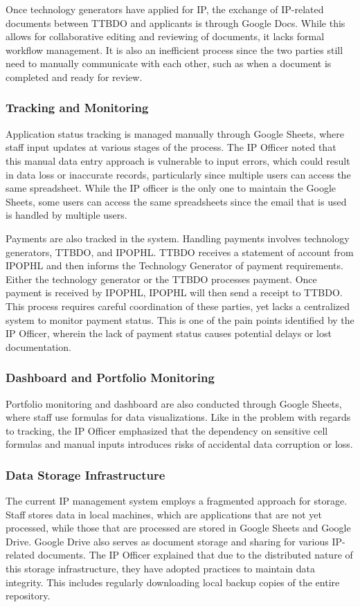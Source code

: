 Once technology generators have applied for IP, the exchange of IP-related documents between TTBDO and applicants is through Google Docs. While this allows for collaborative editing and reviewing of documents, it lacks formal workflow management. It is also an inefficient process since the two parties still need to manually communicate with each other, such as when a document is completed and ready for review.

\subsubsection{Tracking and Monitoring}
Application status tracking is managed manually through Google Sheets, where staff input updates at various stages of the process. The IP Officer noted that this manual data entry approach is vulnerable to input errors, which could result in data loss or inaccurate records, particularly since multiple users can access the same spreadsheet. While the IP officer is the only one to maintain the Google Sheets, some users can access the same spreadsheets since the email that is used is handled by multiple users.

Payments are also tracked in the system. Handling payments involves technology generators, TTBDO, and IPOPHL. TTBDO receives a statement of account from IPOPHL and then informs the Technology Generator of payment requirements. Either the technology generator or the TTBDO processes payment. Once payment is received by IPOPHL, IPOPHL will then send a receipt to TTBDO. This process requires careful coordination of these parties, yet lacks a centralized system to monitor payment status. This is one of the pain points identified by the IP Officer, wherein the lack of payment status causes potential delays or lost documentation.

\subsubsection{Dashboard and Portfolio Monitoring}
Portfolio monitoring and dashboard are also conducted through Google Sheets, where staff use formulas for data visualizations. Like in the problem with regards to tracking, the IP Officer emphasized that the dependency on sensitive cell formulas and manual inputs introduces risks of accidental data corruption or loss.

\subsubsection{Data Storage Infrastructure}
The current IP management system employs a fragmented approach for storage. Staff stores data in local machines, which are applications that are not yet processed, while those that are processed are stored in Google Sheets and Google Drive. Google Drive also serves as document storage and sharing for various IP-related documents. The IP Officer explained that due to the distributed nature of this storage infrastructure, they have adopted practices to maintain data integrity. This includes regularly downloading local backup copies of the entire repository.

